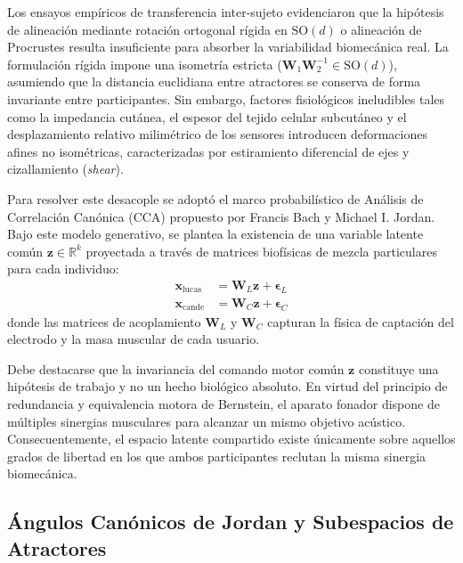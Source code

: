 \documentclass[11pt,a4paper]{article}
\begin{document}
Los ensayos empíricos de transferencia inter-sujeto evidenciaron que la hipótesis de alineación mediante rotación ortogonal rígida en $\text{SO}(d)$ o alineación de Procrustes resulta insuficiente para absorber la variabilidad biomecánica real. La formulación rígida impone una isometría estricta ($\mathbf{W}_1 \mathbf{W}_2^{-1} \in \text{SO}(d)$), asumiendo que la distancia euclidiana entre atractores se conserva de forma invariante entre participantes. Sin embargo, factores fisiológicos ineludibles tales como la impedancia cutánea, el espesor del tejido celular subcutáneo y el desplazamiento relativo milimétrico de los sensores introducen deformaciones afines no isométricas, caracterizadas por estiramiento diferencial de ejes y cizallamiento (\textit{shear}).

Para resolver este desacople se adoptó el marco probabilístico de Análisis de Correlación Canónica (CCA) propuesto por Francis Bach y Michael I. Jordan. Bajo este modelo generativo, se plantea la existencia de una variable latente común $\mathbf{z} \in \mathbb{R}^k$ proyectada a través de matrices biofísicas de mezcla particulares para cada individuo:
\begin{align}
    \mathbf{x}_{\text{lucas}} &= \mathbf{W}_L \mathbf{z} + \boldsymbol{\epsilon}_L \\
    \mathbf{x}_{\text{cande}} &= \mathbf{W}_C \mathbf{z} + \boldsymbol{\epsilon}_C
\end{align}
donde las matrices de acoplamiento $\mathbf{W}_L$ y $\mathbf{W}_C$ capturan la física de captación del electrodo y la masa muscular de cada usuario. 

Debe destacarse que la invariancia del comando motor común $\mathbf{z}$ constituye una hipótesis de trabajo y no un hecho biológico absoluto. En virtud del principio de redundancia y equivalencia motora de Bernstein, el aparato fonador dispone de múltiples sinergias musculares para alcanzar un mismo objetivo acústico. Consecuentemente, el espacio latente compartido existe únicamente sobre aquellos grados de libertad en los que ambos participantes reclutan la misma sinergia biomecánica.

\subsection{Ángulos Canónicos de Jordan y Subespacios de Atractores}
\label{subsec:angulos_jordan}
\end{document}
